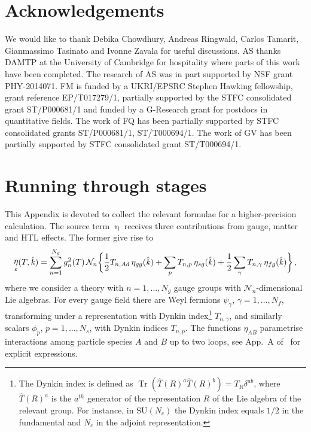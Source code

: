 \documentclass[a4paper,11pt]{article}
\DeclareMathOperator{\Tr}{Tr}
\DeclareMathOperator{\heta}{\eta}
\DeclareMathOperator{\hk}{\hat{\mathit{k}}}
\begin{document}
\section*{Acknowledgements}

We would like to thank Debika Chowdhury, Andreas Ringwald, Carlos Tamarit, Gianmassimo Tasinato and Ivonne Zavala for useful discussions.
AS thanks DAMTP at the University of Cambridge for hospitality where parts of this work have been completed. 
The research of AS was in part supported by NSF grant PHY-2014071.
FM is funded by a UKRI/EPSRC Stephen Hawking fellowship, grant reference EP/T017279/1, partially supported by the STFC consolidated grant ST/P000681/1 and funded by a G-Research grant for postdocs in quantitative fields.
 The work of FQ has been partially supported by STFC consolidated grants ST/P000681/1, ST/T000694/1. The work of GV has been partially supported by STFC consolidated grant ST/T000694/1.

\appendix 

\section{Running through stages}\label{sec: integrate omega}

This Appendix is devoted to collect the relevant formulae for a higher-precision calculation. The source term $\heta$ receives three contributions from gauge, matter and HTL effects.
The former give rise to
\begin{align}\label{eq:eta_g}
\heta_{\text{\tiny{g}}}(T, \hk) =  \sum_{n=1}^{N_g} g^2_n(T) \, \mathcal{N}_n \bigg\lbrace \frac{1}{2} T_{n,Ad} \, \eta_{gg}(\hk) + \sum_{p}{T_{n,p} \, \eta_{sg}(\hk) + \frac{1}{2} \sum_{\gamma}{T_{n,\gamma} \, \eta_{fg}(\hk)}} \bigg\rbrace \,,
\end{align}
where we consider a theory with $n=1,\ldots,N_g$ gauge groups with $\mathcal{N}_n$-dimensional Lie algebras.
For every gauge field there are Weyl fermions $\psi_{\gamma}$, $\gamma=1,\ldots ,N_{f}$, transforming under a representation with Dynkin index\footnote{The Dynkin index is defined as $\Tr(\hat{T}(R)^a \hat{T}(R)^b)=T_R\delta^{ab}$, where $\hat{T}(R)^a$ is the $a^{th}$ generator of the representation $R$ of the Lie algebra of the relevant group. For instance, in $\text{SU}(N_c)$ the Dynkin index equals $1/2$ in the fundamental and $N_c$ in the adjoint representation.} $T_{n,\gamma}$, and similarly scalars $\phi_{p}$, $p=1,\ldots ,N_{s}$, with Dynkin indices $T_{n,p}$. 
The functions $\eta_{AB}$ parametrise interactions among particle species $A$ and $B$ up to two loops, see App.~A of~\cite{Ringwald:2020ist} for explicit expressions. 
\end{document}
